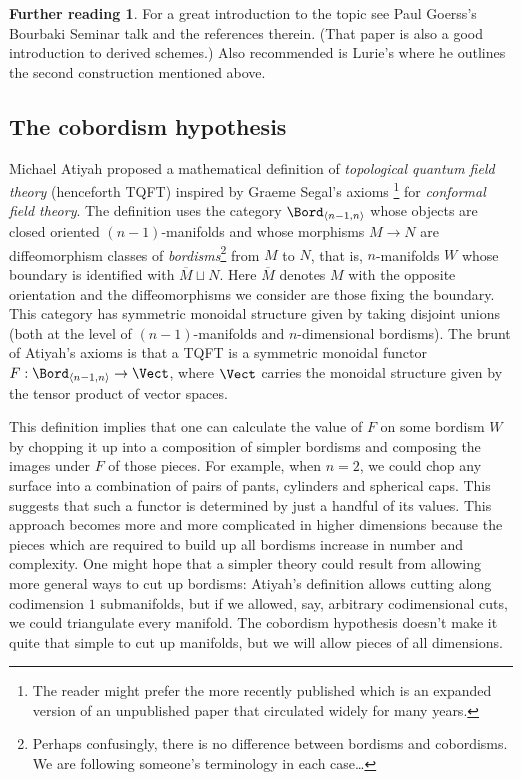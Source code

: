 \documentclass[12pt]{amsart}
\theoremstyle{definition} \newtheorem{definition}[theorem]{Definition}
\newtheorem*{further}{Further reading}
\numberwithin{equation}{section}
\begin{document}
\begin{further}
  For a great introduction to the topic see Paul Goerss's
  Bourbaki Seminar talk \cite{Goerss} and the references therein.
  (That paper is also a good introduction to derived schemes.)
  Also recommended is Lurie's \cite{LurieTMF} where he outlines the
  second construction mentioned above.
\end{further}


\subsection{The cobordism hypothesis}

Michael Atiyah \cite{Atiyah} proposed a mathematical definition of
\emph{topological quantum field theory} (henceforth TQFT) inspired by
Graeme Segal's axioms \cite{SegalCFT}\footnote{The reader might prefer
  the more recently published \cite{SegalCFT2} which is an expanded
  version of an unpublished paper that circulated widely for many
  years.} for \emph{conformal field theory}. The definition uses the
category $\Bord_{\langle n-1,n\rangle}$ whose objects are closed
oriented $(n-1)$-manifolds and whose morphisms $M \to N$ are
diffeomorphism classes of \emph{bordisms}\footnote{Perhaps
  confusingly, there is no difference between bordisms and
  cobordisms. We are following someone's terminology in each
  case\dots} from $M$ to $N$, that is, $n$-manifolds $W$ whose
boundary is identified with $\overline{M} \sqcup N$. Here
$\overline{M}$ denotes $M$ with the opposite orientation and the
diffeomorphisms we consider are those fixing the boundary.  This
category has symmetric monoidal structure given by taking disjoint
unions (both at the level of $(n-1)$-manifolds and $n$-dimensional
bordisms). The brunt of Atiyah's axioms is that a TQFT is a symmetric
monoidal functor $F : \Bord_{\langle n-1, n\rangle} \to \Vect$, where
$\Vect$ carries the monoidal structure given by the tensor product of
vector spaces.

This definition implies that one can calculate the value of $F$ on
some bordism $W$ by chopping it up into a composition of simpler
bordisms and composing the images under $F$ of those pieces. For
example, when $n=2$, we could chop any surface into a combination of
pairs of pants, cylinders and spherical caps. This suggests that such
a functor is determined by just a handful of its values. This approach
becomes more and more complicated in higher dimensions because the
pieces which are required to build up all bordisms increase in number
and complexity. One might hope that a simpler theory could result from
allowing more general ways to cut up bordisms: Atiyah's definition
allows cutting along codimension $1$ submanifolds, but if we allowed,
say, arbitrary codimensional cuts, we could triangulate every
manifold. The cobordism hypothesis doesn't make it quite that simple
to cut up manifolds, but we will allow pieces of all dimensions.
\end{document}
